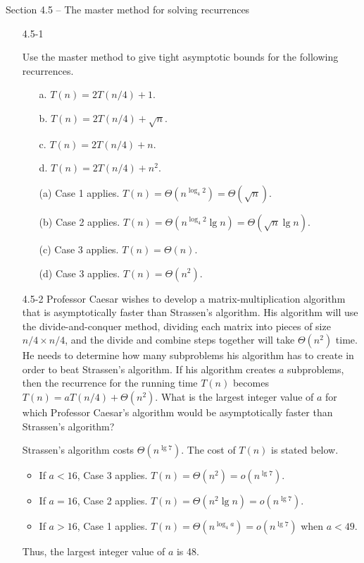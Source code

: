 \documentclass{report}
\makeatletter
\renewenvironment{framed}{%
 \def\FrameCommand##1{\hskip\@totalleftmargin
 \fboxsep=\FrameSep\fbox{##1}}%
 \MakeFramed {\advance\hsize-\width
   \@totalleftmargin\z@ \linewidth\hsize
   \@setminipage}}%
 {\par\unskip\endMakeFramed}
\makeatother
\begin{document}
\newpage

{\large Section 4.5 {--} The master method for solving recurrences}

\begin{enumerate}

\item[4.5{-}1]{Use the master method to give tight asymptotic bounds for the
following recurrences.

\begin{enumerate}
  \item[a.] $T(n) = 2T(n/4) + 1$.
  \item[b.] $T(n) = 2T(n/4) + \sqrt{n}$.
  \item[c.] $T(n) = 2T(n/4) + n$.
  \item[d.] $T(n) = 2T(n/4) + n^2$.
\end{enumerate}
}

\begin{framed}
\begin{enumerate}
  \item[(a)] Case 1 applies. $T(n) = \Theta(n^{\log_4{2}}) = \Theta(\sqrt{n})$.
  \item[(b)] Case 2 applies. $T(n) = \Theta(n^{\log_4{2}} \lg n) = \Theta(\sqrt{n} \lg n)$.
  \item[(c)] Case 3 applies. $T(n) = \Theta(n)$.
  \item[(d)] Case 3 applies. $T(n) = \Theta(n^2)$.
\end{enumerate}
\end{framed}

\item[4.5{-}2]{Professor Caesar wishes to develop a matrix-multiplication
algorithm that is asymptotically faster than Strassen's algorithm. His algorithm
will use the divide-and-conquer method, dividing each matrix into pieces of
size $n/4 \times n/4$, and the divide and combine steps together will take
$\Theta(n^2)$ time. He needs to determine how many subproblems his algorithm has
to create in order to beat Strassen's algorithm. If his algorithm creates $a$
subproblems, then the recurrence for the running time $T(n)$ becomes
$T(n) = a T(n/4) + \Theta(n^2)$. What is the largest integer value of $a$ for
which Professor Caesar's algorithm would be asymptotically faster than
Strassen's algorithm?}

\begin{framed}
Strassen's algorithm costs $\Theta(n^{\lg 7})$. The cost of $T(n)$ is stated
below.
\begin{itemize}
  \item If $a < 16$, Case 3 applies. $T(n) = \Theta(n^2) = o(n^{\lg 7})$.
  \item If $a = 16$, Case 2 applies. $T(n) = \Theta(n^2 \lg n) = o(n^{\lg 7})$.
  \item If $a > 16$, Case 1 applies. $T(n) = \Theta(n^{\log_4{a}}) = o(n^{\lg 7})$ when $a < 49$.
\end{itemize}
Thus, the largest integer value of $a$ is 48.
\end{framed}


\end{enumerate}
\end{document}
